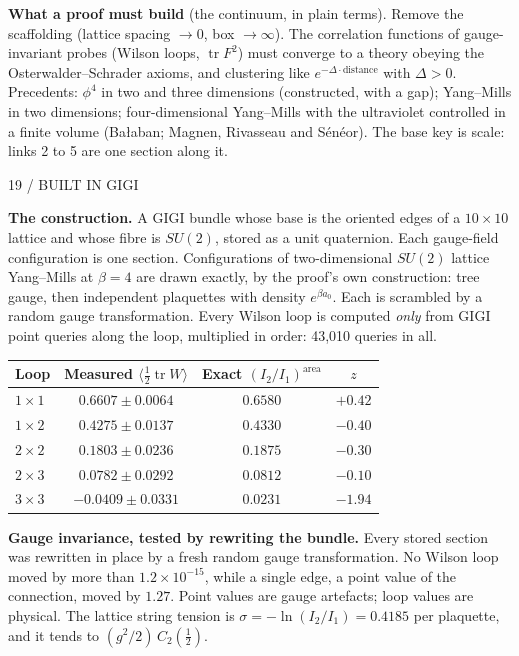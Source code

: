 \documentclass[11pt,letterpaper]{article}
\theoremstyle{plain}
\theoremstyle{definition}
\newcommand{\eyebrow}[1]{{\sffamily\small\color{teal}#1}\par}
\newcommand{\pagetitle}[2]{\eyebrow{#1}\vspace{3pt}{\LARGE #2}\par\vspace{5pt}}
\begin{document}
\textbf{What a proof must build} (the continuum, in plain terms). Remove the
scaffolding (lattice spacing $\to0$, box $\to\infty$). The correlation
functions of gauge-invariant probes (Wilson loops, $\operatorname{tr}F^2$) must
converge to a theory obeying the Osterwalder--Schrader axioms, and clustering
like $e^{-\Delta\cdot\text{distance}}$ with $\Delta>0$. Precedents: $\phi^4$ in
two and three dimensions (constructed, with a gap); Yang--Mills in two
dimensions; four-dimensional Yang--Mills with the ultraviolet controlled in a
finite volume (Ba{\l}aban; Magnen, Rivasseau and S\'en\'eor). The base key is
scale: links 2 to 5 are one section along it.

\newpage
\pagetitle{19 / BUILT IN GIGI}{The bundle, stored as sections and read by holonomy}
\textbf{The construction.} A GIGI bundle whose base is the oriented edges of a
$10\times10$ lattice and whose fibre is $SU(2)$, stored as a unit quaternion.
Each gauge-field configuration is one section. Configurations of
two-dimensional $SU(2)$ lattice Yang--Mills at $\beta=4$ are drawn exactly, by
the proof's own construction: tree gauge, then independent plaquettes with
density $e^{\beta a_0}$. Each is scrambled by a random gauge transformation. Every Wilson loop is computed
\emph{only} from GIGI point queries along the loop, multiplied in order:
43{,}010 queries in all.

\begin{center}\small
\begin{tabular}{@{}lccc@{}}\toprule
Loop & Measured $\langle\tfrac12\operatorname{tr}W\rangle$ & Exact $(I_2/I_1)^{\text{area}}$ & $z$\\\midrule
$1\times1$ & $0.6607\pm0.0064$ & $0.6580$ & $+0.42$\\
$1\times2$ & $0.4275\pm0.0137$ & $0.4330$ & $-0.40$\\
$2\times2$ & $0.1803\pm0.0236$ & $0.1875$ & $-0.30$\\
$2\times3$ & $0.0782\pm0.0292$ & $0.0812$ & $-0.10$\\
$3\times3$ & $-0.0409\pm0.0331$ & $0.0231$ & $-1.94$\\\bottomrule
\end{tabular}
\end{center}

\textbf{Gauge invariance, tested by rewriting the bundle.} Every stored section
was rewritten in place by a fresh random gauge transformation. No Wilson loop
moved by more than $1.2\times10^{-15}$, while a single edge, a point value of
the connection, moved by $1.27$. Point values are gauge artefacts; loop values
are physical. The lattice string tension is
$\sigma=-\ln(I_2/I_1)=0.4185$ per plaquette, and it tends to
$(g^2/2)\,C_2(\tfrac12)$.
\end{document}
